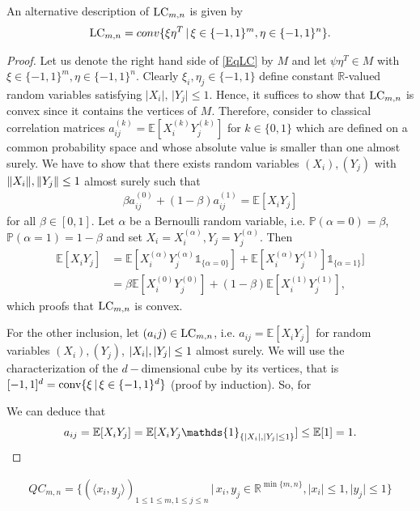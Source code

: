 \begin{lemma}\label{LemLC}
	An alternative description of $ \textup{LC}_{m,n} $ is given by 
	\begin{align}\label{EqLC}
		\textup{LC}_{m,n} = conv \{  \xi\eta^T \, | \, \xi \in \{-1,1\}^m, \eta \in \{-1,1\}^n     \}.
	\end{align}
\end{lemma}
\begin{proof}
	Let us denote the right hand side of \ref{EqLC} by $ M $ and let $ \psi\eta^T \in M $ with $ \xi \in \{-1,1\}^m, \eta \in \{-1,1\}^n $. Clearly $ \xi_i, \eta_j \in \{-1,1\} $ define constant $ \mathbb{R} $-valued random variables satisfying $ \vert X_i \vert, \, \vert Y_j \vert \le 1 $. Hence, it suffices to show that $ \textup{LC}_{m,n} $ is convex since it contains the vertices of $ M $. Therefore, consider to classical correlation matrices $ a_{ij}^{(k)} = \mathbb{E}[X_i^{(k)}Y_{j}^{(k)}] $ for $ k \in \{0,1\} $ which are defined on a common probability space and whose absolute value is smaller than one almost surely. We have to show that there exists random variables $ (X_i),(Y_j) $ with $  \Vert {X_i} \Vert, \Vert {Y_j} \Vert \le 1 $ almost surely such that
	\begin{align}
		\beta a_{ij}^{(0)}+ (1-\beta)a_{ij}^{(1)} = \mathbb{E}[X_iY_j]
	\end{align}
	for all $ \beta \in [0,1] $.
	Let $ \alpha $ be a Bernoulli random variable, i.e. $ \mathbb{P}(\alpha = 0) = \beta $, $ \mathbb{P}(\alpha = 1) = 1 - \beta$ and set $ X_i = X_i^{(\alpha)}, Y_j = Y_j^{(\alpha)} $.
	Then 
	\begin{align*}
		\mathbb{E}[X_iY_j] &= \mathbb{E}[X_i^{(\alpha)}Y_j^{(\alpha)}  \mathds{1}_{ \{\alpha = 0\}}] + \mathbb{E}[X_i^{(\alpha)}Y_j^{(1)}]\mathds{1}_{\{\alpha = 1\}}] \\
		&= \beta \mathbb{E}[X_i^{(0)}Y_j^{(0)} ] + (1-\beta) \mathbb{E}[X_i^{(1)}Y_j^{(1)}],
	\end{align*} 
	which proofs that $ \textup{LC}_{m,n} $ is convex.
	
	
	
	For the other inclusion, let $ (a_ij) \in \textup{LC}_{m,n} $, i.e. $ a_{ij} = \mathbb{E}[X_iY_j] $ for random variables $ (X_i),(Y_j) $, $ {\left|{X_i}\right|},{\left|{Y_j}\right|} \le 1 $ almost surely. 
	We will use the characterization of the $ d-$dimensional cube by its vertices, that is $ [-1,1]^d = \textup{conv} \{\xi \, | \, \xi \in \{-1,1 \}^d \}$ (proof by induction). So, for 
	
	We can deduce that 
	\begin{align*}
		a_{ij} = \mathbb{E}[X_iY_j] = \mathbb{E}[X_iY_j \mathds{1}_{\{ \modul{X_i},\modul{Y_j}\le 1 \}}] \le \mathbb{E}[1] = 1.
	\end{align*}

	
	
\end{proof}





\begin{lemma}\label{LemQC}
	\begin{align*}
		QC_{m,n} = \{ (\langle x_i,y_j \rangle)_{1 \le 1 \le m, 1 \le j \le n} \,| \, x_i,y_j \in \mathbb{R}^{ \min \{m,n \} }, \vert x_i  \vert \le 1, \vert y_j \vert \le 1  \}
	\end{align*}
\end{lemma}
